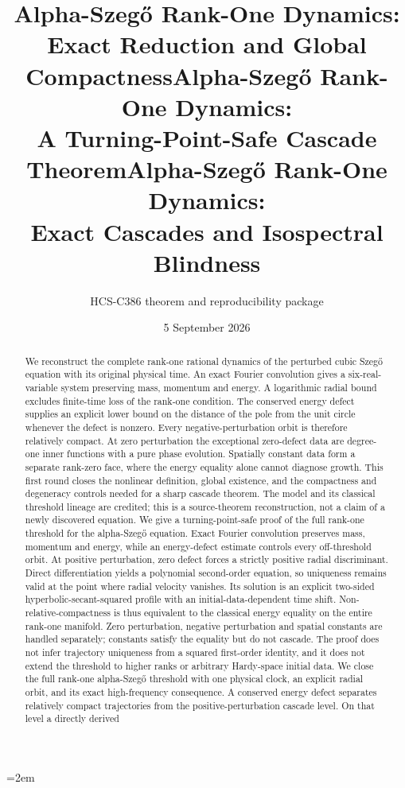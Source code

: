 \documentclass[10pt]{article}
\title{Alpha-Szeg\H{o} Rank-One Dynamics:\\Exact Reduction and Global Compactness}
\title{Alpha-Szeg\H{o} Rank-One Dynamics:\\A Turning-Point-Safe Cascade Theorem}
\title{Alpha-Szeg\H{o} Rank-One Dynamics:\\Exact Cascades and Isospectral Blindness}
\author{HCS-C386 theorem and reproducibility package}
\date{5 September 2026}
\begin{document}
\emergencystretch=2em
\maketitle
\begin{abstract}
\ifcase\CRevisionRound
We reconstruct the complete rank-one rational dynamics of the perturbed cubic
Szeg\H{o} equation with its original physical time. An exact Fourier convolution
gives a six-real-variable system preserving mass, momentum and energy.
A logarithmic radial bound excludes finite-time loss of the rank-one condition.
The conserved energy defect supplies an explicit lower bound on the distance
of the pole from the unit circle whenever the defect is nonzero.
Every negative-perturbation orbit is therefore relatively compact.
At zero perturbation the exceptional zero-defect data are degree-one inner
functions with a pure phase evolution. Spatially constant data form a separate
rank-zero face, where the energy equality alone cannot diagnose growth.
This first round closes the nonlinear definition, global existence, and the
compactness and degeneracy controls needed for a sharp cascade theorem.
The model and its classical threshold lineage are credited; this is a
source-theorem reconstruction, not a claim of a newly discovered equation.
\or
We give a turning-point-safe proof of the full rank-one threshold for the
alpha-Szeg\H{o} equation. Exact Fourier convolution preserves mass, momentum
and energy, while an energy-defect estimate controls every off-threshold orbit.
At positive perturbation, zero defect forces a strictly positive radial
discriminant. Direct differentiation yields a polynomial second-order
equation, so uniqueness remains valid at the point where radial velocity
vanishes. Its solution is an explicit two-sided hyperbolic-secant-squared
profile with an initial-data-dependent time shift.
Non-relative-compactness is thus equivalent to the classical energy equality
on the entire rank-one manifold. Zero perturbation, negative perturbation and
spatial constants are handled separately; constants satisfy the equality but
do not cascade. The proof does not infer trajectory uniqueness from a squared
first-order identity, and it does not extend the threshold to higher ranks or
arbitrary Hardy-space initial data.
\else
We close the full rank-one alpha-Szeg\H{o} threshold with one physical clock,
an explicit radial orbit, and its exact high-frequency consequence.
A conserved energy defect separates relatively compact trajectories from the
positive-perturbation cascade level. On that level a directly derived

\end{abstract}
\end{document}

